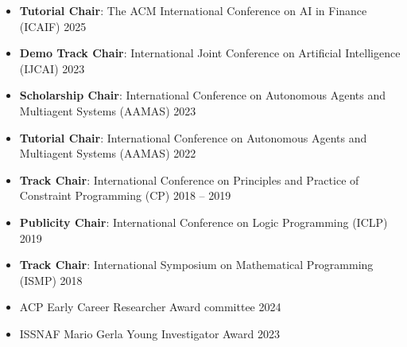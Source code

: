   \begin{itemize}
    \item {\bf Tutorial Chair}:
    The ACM International Conference on AI in Finance (ICAIF) 
    \hfill{2025}

    \item {\bf Demo Track Chair}: 
    International Joint Conference on Artificial Intelligence (IJCAI)
    \hfill{2023}

    \item {\bf Scholarship Chair}: 
    International Conference on Autonomous Agents and Multiagent Systems (AAMAS)
    \hfill{2023}

    \item {\bf Tutorial Chair}: 
    International Conference on Autonomous Agents and Multiagent Systems (AAMAS)
    \hfill{2022}
    
  \item {\bf Track Chair}: 
  {International Conference on Principles and Practice of Constraint Programming (CP)}
    \hfill{2018 -- 2019}

  \item {\bf Publicity Chair}: {International Conference on Logic Programming (ICLP)}
  \hfill{2019}

  \item {\bf Track Chair}: {International Symposium on Mathematical Programming (ISMP)}
  \hfill{2018}
 
\end{itemize}


  \begin{itemize}
    \item ACP Early Career Researcher Award committee
    \hfill{2024}
    \item ISSNAF Mario Gerla Young Investigator Award 
    \hfill{2023}
  \end{itemize}

